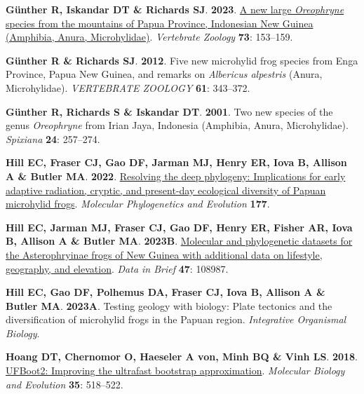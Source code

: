 \documentclass[
  letterpaper,
  DIV=11,
  numbers=noendperiod]{scrartcl}
\newlength{\cslhangindent}
\newenvironment{CSLReferences}[2] %
 {\begin{list}{}{%
  \setlength{\itemindent}{0pt}
  \setlength{\leftmargin}{0pt}
  \setlength{\parsep}{0pt}
  \ifodd #1
   \setlength{\leftmargin}{\cslhangindent}
   \setlength{\itemindent}{-1\cslhangindent}
  \fi
  \setlength{\itemsep}{#2\baselineskip}}}
 {\end{list}}
\begin{document}
\begin{CSLReferences}{0}{1}
\textbf{\textbf{Günther R}, \textbf{Iskandar DT} \& \textbf{Richards
SJ}}. \textbf{2023}. \href{https://doi.org/10.3897/vz.73.e94207}{{A new
large \emph{Oreophryne} species from the mountains of Papua Province,
Indonesian New Guinea (Amphibia, Anura, Microhylidae)}}.
\emph{Vertebrate Zoology} \textbf{73}: 153--159.

\textbf{\textbf{Günther R} \& \textbf{Richards SJ}}. \textbf{2012}.
{Five new microhylid frog species from Enga Province, Papua New Guinea,
and remarks on \emph{Albericus alpestris} (Anura, Microhylidae)}.
\emph{VERTEBRATE ZOOLOGY} \textbf{61}: 343--372.

\textbf{\textbf{Günther R}, \textbf{Richards S} \& \textbf{Iskandar
DT}}. \textbf{2001}. {Two new species of the genus \emph{Oreophryne}
from Irian Jaya, Indonesia (Amphibia, Anura, Microhylidae)}.
\emph{Spixiana} \textbf{24}: 257--274.

\textbf{\textbf{Hill EC}, \textbf{Fraser CJ}, \textbf{Gao DF},
\textbf{Jarman MJ}, \textbf{Henry ER}, \textbf{Iova B}, \textbf{Allison
A} \& \textbf{Butler MA}}. \textbf{2022}.
\href{https://doi.org/10.1016/j.ympev.2022.107618}{{Resolving the deep
phylogeny: Implications for early adaptive radiation, cryptic, and
present-day ecological diversity of Papuan microhylid frogs}}.
\emph{Molecular Phylogenetics and Evolution} \textbf{177}.

\textbf{\textbf{Hill EC}, \textbf{Jarman MJ}, \textbf{Fraser CJ},
\textbf{Gao DF}, \textbf{Henry ER}, \textbf{Fisher AR}, \textbf{Iova B},
\textbf{Allison A} \& \textbf{Butler MA}}. \textbf{2023B}.
\href{https://doi.org/10.1016/j.dib.2023.108987}{{Molecular and
phylogenetic datasets for the Asterophryinae frogs of New Guinea with
additional data on lifestyle, geography, and elevation}}. \emph{Data in
Brief} \textbf{47}: 108987.

\textbf{\textbf{Hill EC}, \textbf{Gao DF}, \textbf{Polhemus DA},
\textbf{Fraser CJ}, \textbf{Iova B}, \textbf{Allison A} \&
\textbf{Butler MA}}. \textbf{2023A}. {Testing geology with biology:
Plate tectonics and the diversification of microhylid frogs in the
Papuan region}. \emph{Integrative Organismal Biology}.

\textbf{\textbf{Hoang DT}, \textbf{Chernomor O}, \textbf{Haeseler A
von}, \textbf{Minh BQ} \& \textbf{Vinh LS}}. \textbf{2018}.
\href{https://doi.org/10.1093/molbev/msx281}{UFBoot2: Improving the
ultrafast bootstrap approximation}. \emph{Molecular Biology and
Evolution} \textbf{35}: 518--522.


\end{CSLReferences}
\end{document}

